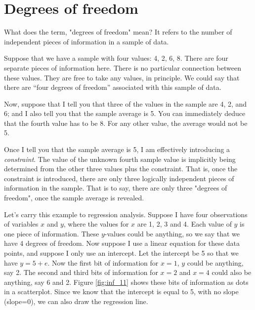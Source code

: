 \documentclass[]{book}\usepackage[]{graphicx}\usepackage[]{color}
\begin{document}
% 
% 
% 
% 
% 


\section{Degrees of freedom}


What does the term, "degrees of freedom" mean? It refers to the number of independent pieces of information in a sample of data.

Suppose that we have a sample with four values: {4, 2, 6, 8}. There are four separate pieces of information here. There is no particular connection between these values. They are free to take any values, in principle. We could say that there are “four degrees of freedom” associated with this sample of data.

Now, suppose that I tell you that three of the values in the sample are 4, 2, and 6; and I also tell you that the sample average is 5. You can immediately deduce that the fourth value has to be 8. For any other value, the average would not be 5. 

Once I tell you that the sample average is 5, I am effectively introducing a \textit{constraint}. The value of the unknown fourth sample value is implicitly being determined from the other three values plus the constraint. That is, once the constraint is introduced, there are only three logically independent pieces of information in the sample. That is to say, there are only three "degrees of freedom", once the sample average is revealed.

Let's carry this example to regression analysis. Suppose I have four observations of variables $x$ and $y$, where the values for $x$ are 1, 2, 3 and 4. Each value of $y$ is one piece of information. These $y$-values could be anything, so we say that we have 4 degrees of freedom. Now suppose I use a linear equation for these data points, and suppose I only use an intercept. Let the intercept be 5 so that we have $y=5+e$. Now the first bit of information for $x=1$, $y$ could be anything, say 2. The second and third bits of information for $x=2$ and $x=4$ could also be anything, say 6 and 2. Figure \ref{fig:inf_11} shows these bits of information as dots in a scatterplot. Since we know that the intercept is equal to 5, with no slope (slope=0), we can also draw the regression line.
\end{document}
